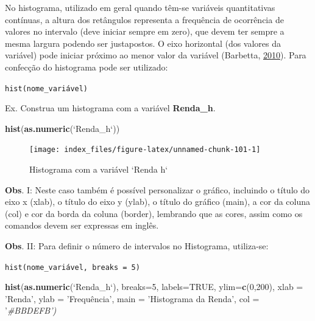 \documentclass[12pt,brazil,oneside]{book}
\newenvironment{Shaded}{\begin{snugshade}}{\end{snugshade}}
\newcommand{\CommentTok}[1]{\textcolor[rgb]{0.56,0.35,0.01}{\textit{#1}}}
\newcommand{\DataTypeTok}[1]{\textcolor[rgb]{0.13,0.29,0.53}{#1}}
\newcommand{\DecValTok}[1]{\textcolor[rgb]{0.00,0.00,0.81}{#1}}
\newcommand{\KeywordTok}[1]{\textcolor[rgb]{0.13,0.29,0.53}{\textbf{#1}}}
\newcommand{\NormalTok}[1]{#1}
\newcommand{\OtherTok}[1]{\textcolor[rgb]{0.56,0.35,0.01}{#1}}
\newcommand{\StringTok}[1]{\textcolor[rgb]{0.31,0.60,0.02}{#1}}
\begin{document}
No histograma, utilizado em geral quando têm-se variáveis quantitativas contínuas, a altura dos retângulos representa a frequência de ocorrência de valores no intervalo (deve iniciar sempre em zero), que devem ter sempre a mesma largura podendo ser justapostos. O eixo horizontal (dos valores da variável) pode iniciar próximo ao menor valor da variável (Barbetta, \protect\hyperlink{ref-barbetta1988}{2010}). Para confecção do histograma pode ser utilizado:

\texttt{hist(nome\_variável)}

Ex. Construa um histograma com a variável \textbf{Renda\_h}.

\begin{Shaded}
\begin{Highlighting}[]
\KeywordTok{hist}\NormalTok{(}\KeywordTok{as.numeric}\NormalTok{(}\StringTok{`}\DataTypeTok{Renda_h}\StringTok{`}\NormalTok{))}
\end{Highlighting}
\end{Shaded}

\begin{figure}[H]

{\centering \texttt{[image: index\_files/figure-latex/unnamed-chunk-101-1]} 

}

\caption{Histograma com a variável `Renda h`}\label{fig:unnamed-chunk-101}
\end{figure}

\textbf{Obs}. I: Neste caso também é possível personalizar o gráfico, incluindo o título do eixo x (xlab), o título do eixo y (ylab), o título do gráfico (main), a cor da coluna (col) e cor da borda da coluna (border), lembrando que as cores, assim como os comandos devem ser expressas em inglês.

\textbf{Obs}. II: Para definir o número de intervalos no Histograma, utiliza-se:

\texttt{hist(nome\_variável,\ breaks\ =\ 5)}

\begin{Shaded}
\begin{Highlighting}[]
\KeywordTok{hist}\NormalTok{(}\KeywordTok{as.numeric}\NormalTok{(}\StringTok{`}\DataTypeTok{Renda_h}\StringTok{`}\NormalTok{), }
     \DataTypeTok{breaks=}\DecValTok{5}\NormalTok{, }
     \DataTypeTok{labels=}\OtherTok{TRUE}\NormalTok{, }
     \DataTypeTok{ylim=}\KeywordTok{c}\NormalTok{(}\DecValTok{0}\NormalTok{,}\DecValTok{200}\NormalTok{), }
     \DataTypeTok{xlab =} \StringTok{'Renda'}\NormalTok{,}
     \DataTypeTok{ylab =} \StringTok{'Frequência',}
\StringTok{     main = '}\NormalTok{Histograma da Renda}\StringTok{',}
\StringTok{     col = '}\CommentTok{#BBDEFB')}
\end{Highlighting}
\end{Shaded}
\end{document}
